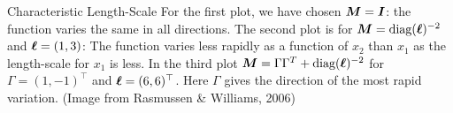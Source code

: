 \begin{frame}[c,allowframebreaks]{Characteristic Length-Scale}
\vspace{3mm}
For the first plot, we have chosen $\bm{M} = \boldsymbol{I}$: the function varies the same in all directions. The second plot is for $\bm{M} = \text{diag}(\bm{\ell})^{-2}$ and $\bm{\ell} = \left(1, 3 \right)$: The function varies less rapidly as a function of $x_2$ than $x_1$ as the length-scale for $x_1$ is less. In the third plot $\bm{M} = \Gamma \Gamma^T + \text{diag}(\bm{\ell})^{-2}$ for $\Gamma = (1, -1)^\top$ and $\bm{\ell} = (6, 6)^\top$. Here $\Gamma$ gives the direction of the most rapid variation. (Image from Rasmussen \& Williams, 2006)


\end{frame}


